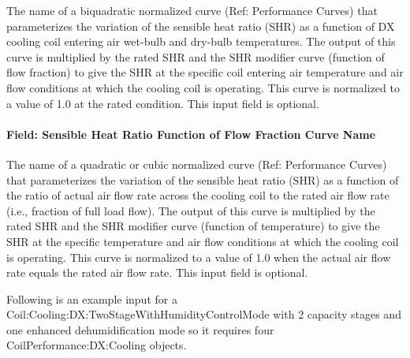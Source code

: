 The name of a biquadratic normalized curve (Ref: Performance Curves) that parameterizes the variation of the sensible heat ratio (SHR) as a function of DX cooling coil entering air wet-bulb and dry-bulb temperatures. The output of this curve is multiplied by the rated SHR and the SHR modifier curve (function of flow fraction) to give the SHR at the specific coil entering air temperature and air flow conditions at which the cooling coil is operating. This curve is normalized to a value of 1.0 at the rated condition. This input field is optional.

\paragraph{Field: Sensible Heat Ratio Function of Flow Fraction Curve Name}\label{field-sensible-heat-ratio-function-of-flow-fraction-curve-name-2}

The name of a quadratic or cubic normalized curve (Ref: Performance Curves) that parameterizes the variation of the sensible heat ratio (SHR) as a function of the ratio of actual air flow rate across the cooling coil to the rated air flow rate (i.e., fraction of full load flow). The output of this curve is multiplied by the rated SHR and the SHR modifier curve (function of temperature) to give the SHR at the specific temperature and air flow conditions at which the cooling coil is operating. This curve is normalized to a value of 1.0 when the actual air flow rate equals the rated air flow rate. This input field is optional.

Following is an example input for a Coil:Cooling:DX:TwoStageWithHumidityControlMode with 2 capacity stages and one enhanced dehumidification mode so it requires four CoilPerformance:DX:Cooling objects.

